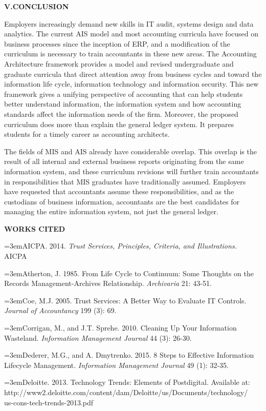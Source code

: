 \documentclass[12pt]{article}
\newcommand{\Section}[2]{\vspace{.2in}\centerline{\normalsize{}\textbf{#1\quad{}\MakeUppercase{#2}}}\nopagebreak{}\smallskip{}\indent{}}
\newcommand{\Reference}[1]{\parindent=0pt\hangindent=3em\hangafter=1#1\vspace{.15in}}
\begin{document}
\Section{V.}{Conclusion}
Employers increasingly demand new skills in IT audit, systems design and data analytics. The current AIS model and most accounting curricula have focused on business processes since the inception of ERP, and a modification of the curriculum is necessary to train accountants in these new areas. The Accounting Architecture framework provides a model and revised undergraduate and graduate curricula that direct attention away from business cycles and toward the information life cycle, information technology and information security. This new framework gives a unifying perspective of accounting that can help students better understand information, the information system and how accounting standards affect the information needs of the firm. Moreover, the proposed curriculum does more than explain the general ledger system. It prepares students for a timely career as accounting architects.

The fields of MIS and AIS already have considerable overlap. This overlap is the result of all internal and external business reports originating from the same information system, and these curriculum revisions will further train accountants in responsibilities that MIS graduates have traditionally assumed. Employers have requested that accountants assume these responsibilities, and as the custodians of business information, accountants are the best candidates for managing the entire information system, not just the general ledger.
\newpage{}

\centerline{\textbf{\MakeUppercase{Works Cited}}}
\smallskip{}
\singlespace{}
\Reference{AICPA. 2014. \emph{Trust Services, Principles, Criteria, and Illustrations.} AICPA}

\Reference{Atherton, J. 1985. From Life Cycle to Continuum: Some Thoughts on the Records Management-Archives Relationship. \emph{Archivaria} 21: 43-51.}

\Reference{Coe, M.J. 2005. Trust Services: A Better Way to Evaluate IT Controls. \emph{Journal of Accountancy} 199 (3): 69.}

\Reference{Corrigan, M., and J.T. Sprehe. 2010. Cleaning Up Your Information Wasteland. \emph{Information Management Journal} 44 (3): 26-30.}

\Reference{Dederer, M.G., and A. Dmytrenko. 2015. 8 Steps to Effective Information Lifecycle Management. \emph{Information Management Journal} 49 (1): 32-35.}

\Reference{Deloitte. 2013. Technology Trends: Elements of Postdigital. Available at:\\http://www2.deloitte.com/content/dam/Deloitte/us/Documents/technology/\\us-cons-tech-trends-2013.pdf}
\end{document}

